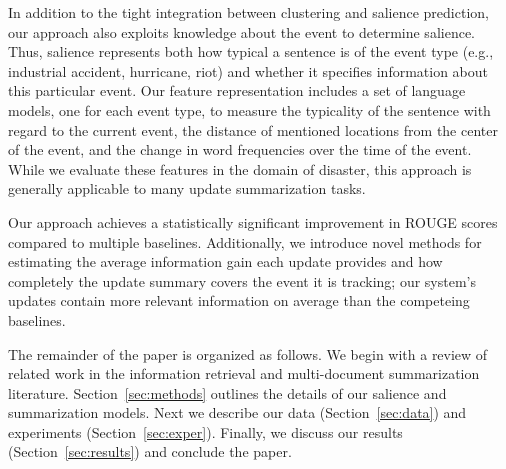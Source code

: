 In addition to the tight integration between clustering and salience
prediction, our approach also exploits knowledge about the event to determine
salience. Thus, salience represents both how typical a sentence is of the  
event
type (e.g., industrial accident, hurricane, riot) and whether it specifies 
information
about this particular event. 
Our feature representation includes a set of language models, one for each
event type, to measure the typicality of the sentence with regard to the 
current event, the distance of mentioned locations from the center of
the event, and the change in word frequencies over the time of the event.
While we evaluate these features in the domain of disaster, this approach is generally applicable to many update summarization tasks.

Our approach achieves a statistically significant improvement in 
 ROUGE scores compared to multiple baselines.
Additionally, we introduce novel methods for estimating the average information
gain each update provides and how completely the update summary covers 
the event it is tracking; our system's updates contain more relevant
information on average than the competeing baselines.


The remainder of the paper is organized as follows.
We begin with a review of related work
in the information retrieval and multi-document
summarization literature. Section~\ref{sec:methods} outlines the details
of our salience and summarization models. Next we describe our
data (Section~\ref{sec:data}) and experiments (Section~\ref{sec:exper}). Finally,
we discuss our results (Section~\ref{sec:results}) and conclude the paper.




